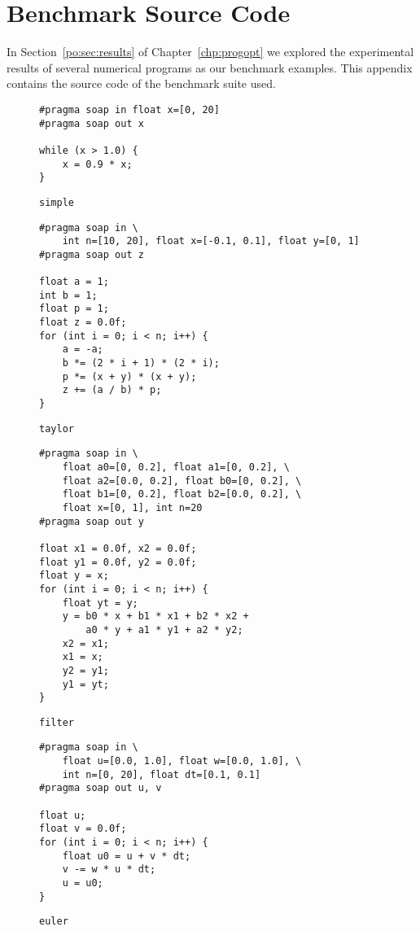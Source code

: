 \chapter{Benchmark Source Code}
\label{app:source}

In Section~\ref{po:sec:results} of Chapter~\ref{chp:progopt} we explored the
experimental results of several numerical programs as our benchmark examples.
This appendix contains the source code of the benchmark suite used.

\begin{figure}[ht]
\begin{lstlisting}
#pragma soap in float x=[0, 20]
#pragma soap out x

while (x > 1.0) {
    x = 0.9 * x;
}
\end{lstlisting}
\caption{\texttt{simple}}
\end{figure}

\begin{figure}[ht]
\begin{lstlisting}
#pragma soap in \
    int n=[10, 20], float x=[-0.1, 0.1], float y=[0, 1]
#pragma soap out z

float a = 1;
int b = 1;
float p = 1;
float z = 0.0f;
for (int i = 0; i < n; i++) {
    a = -a;
    b *= (2 * i + 1) * (2 * i);
    p *= (x + y) * (x + y);
    z += (a / b) * p;
}
\end{lstlisting}
\caption{\texttt{taylor}}
\end{figure}

\begin{figure}[ht]
\begin{lstlisting}
#pragma soap in \
    float a0=[0, 0.2], float a1=[0, 0.2], \
    float a2=[0.0, 0.2], float b0=[0, 0.2], \
    float b1=[0, 0.2], float b2=[0.0, 0.2], \
    float x=[0, 1], int n=20
#pragma soap out y

float x1 = 0.0f, x2 = 0.0f;
float y1 = 0.0f, y2 = 0.0f;
float y = x;
for (int i = 0; i < n; i++) {
    float yt = y;
    y = b0 * x + b1 * x1 + b2 * x2 +
        a0 * y + a1 * y1 + a2 * y2;
    x2 = x1;
    x1 = x;
    y2 = y1;
    y1 = yt;
}
\end{lstlisting}
\caption{\texttt{filter}}
\end{figure}

\begin{figure}[ht]
\begin{lstlisting}
#pragma soap in \
    float u=[0.0, 1.0], float w=[0.0, 1.0], \
    int n=[0, 20], float dt=[0.1, 0.1]
#pragma soap out u, v

float u;
float v = 0.0f;
for (int i = 0; i < n; i++) {
    float u0 = u + v * dt;
    v -= w * u * dt;
    u = u0;
}
\end{lstlisting}
\caption{\texttt{euler}}
\end{figure}

